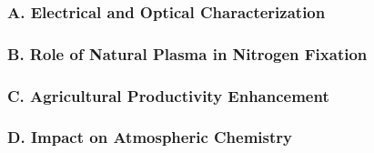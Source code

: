 \subsubsection*{A. Electrical and Optical Characterization}
\lipsum[1][1-2]

\subsubsection*{B. Role of Natural Plasma in Nitrogen Fixation}
\lipsum[1][1-2]

\subsubsection*{C. Agricultural Productivity Enhancement}
\lipsum[1][1-2]

\subsubsection*{D. Impact on Atmospheric Chemistry}
\lipsum[1][1-2]